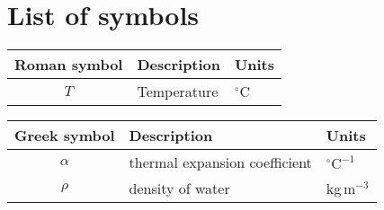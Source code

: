 \chapter*{List of symbols}

	\setlongtables
	\begin{longtable}{cll}
	\hline
	Roman symbol & Description & Units\\
	\hline
	\endhead
	\hline
	\endfoot
	$T$ & Temperature & $^\circ$C\\
\hline
\end{longtable}

	\setlongtables
\begin{longtable}{cll}
\hline
Greek symbol & Description & Units\\
\hline
\endhead
\hline
\endfoot
$\alpha$ & thermal expansion coefficient & $^\circ\textrm{C}^{-1}$\\
$\rho$ & density of water & kg\,m$^{-3}$\\
\hline
\end{longtable}


